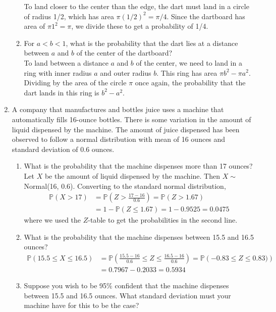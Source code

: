 \documentclass[12pt]{article}
\def\P{{\mathbb P}}
\begin{document}
\begin{enumerate}
\begin{enumerate}
To land closer to the center than the edge, the dart must land in a circle of radius 1/2, which has area $\pi (1/2)^2 = \pi/4$. Since the dartboard has area of $\pi 1^2 = \pi$, we divide these to get a probability of 1/4.

\item For $a < b < 1$, what is the probability that the dart lies at a distance between $a$ and $b$ of the center of the dartboard?\\

To land between a distance $a$ and $b$ of the center, we need to land in a ring with inner radius $a$ and outer radius $b$. This ring has area $\pi b^2 - \pi a^2$. Dividing by the area of the circle $\pi$ once again, the probability that the dart lands in this ring is $b^2 - a^2$.

\end{enumerate}

\item A company that manufactures and bottles juice uses a machine that automatically fills 16-ounce bottles. There is some variation in the amount of liquid dispensed by the machine. The amount of juice dispensed has been observed to follow a normal distribution with mean of 16 ounces and standard deviation of 0.6 ounces.
\begin{enumerate}
\item What is the probability that the machine dispenses more than 17 ounces?\\

Let $X$ be the amount of liquid dispensed by the machine. Then $X \sim$ Normal(16, 0.6). Converting to the standard normal distribution,
\begin{align*}
\P(X > 17) &= \P\left( Z > \frac{17 - 16}{0.6} \right) = \P(Z > 1.67)\\
&= 1 - \P(Z \leq 1.67) = 1 - 0.9525 = 0.0475
\end{align*}
where we used the $Z$-table to get the probabilities in the second line.

\item What is the probability that the machine dispenses between 15.5 and 16.5 ounces?
\begin{align*}
\P(15.5 \leq X \leq 16.5) &= \P\left( \frac{15.5 - 16}{0.6} \leq Z \leq \frac{16.5 - 16}{0.6} \right) = \P\left( -0.83 \leq Z \leq 0.83)\right)\\
&= 0.7967 - 0.2033 = 0.5934
\end{align*}

\item Suppose you wish to be 95\% confident that the machine dispenses between 15.5 and 16.5 ounces. What standard deviation must your machine have for this to be the case?\\


\end{enumerate}
\end{enumerate}
\end{document}

